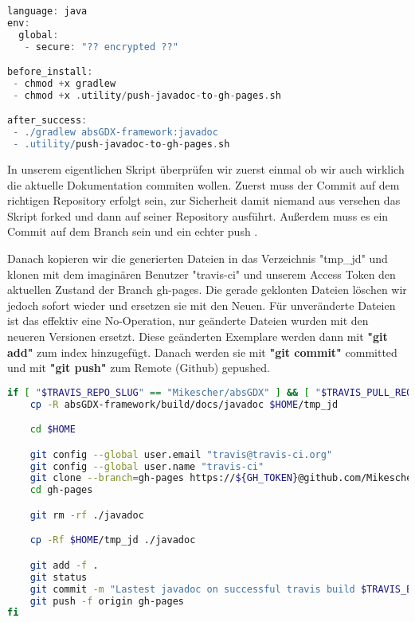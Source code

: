 \doinline
\begin{lstlisting}[caption=TravisCI Konfiguration für das Erzeugen von JavaDoc, title=\hspace{0 pt}, language=groovy]
language: java
env:
  global:
   - secure: "?? encrypted ??"

before_install:
 - chmod +x gradlew
 - chmod +x .utility/push-javadoc-to-gh-pages.sh

after_success:
 - ./gradlew absGDX-framework:javadoc
 - .utility/push-javadoc-to-gh-pages.sh
\end{lstlisting}

In unserem eigentlichen Skript überprüfen wir zuerst einmal ob wir auch wirklich die aktuelle Dokumentation commiten wollen. Zuerst muss der Commit auf dem richtigen Repository erfolgt sein, zur Sicherheit damit niemand aus versehen das Skript forked und dann auf seiner Repository ausführt. Außerdem muss es ein Commit auf dem Branch  sein und ein echter push .

Danach kopieren wir die generierten Dateien in das Verzeichnis "tmp\_jd" und klonen mit dem imaginären Benutzer "travis-ci" und unserem Access Token den aktuellen Zustand der Branch gh-pages. 
Die gerade geklonten Dateien löschen wir jedoch sofort wieder und ersetzen sie mit den Neuen. 
Für unveränderte Dateien ist das effektiv eine No-Operation, nur geänderte Dateien wurden mit den neueren Versionen ersetzt. 
Diese geänderten Exemplare werden dann mit \textbf{"git add"} zum index hinzugefügt. 
Danach werden sie mit \textbf{"git commit"} committed und mit \textbf{"git push"} zum Remote (Github) gepushed.

\doinline
\begin{lstlisting}[caption=Das Javadoc Publish Bashscript, title=\hspace{0 pt}, language=bash]
if [ "$TRAVIS_REPO_SLUG" == "Mikescher/absGDX" ] && [ "$TRAVIS_PULL_REQUEST" == "false" ] && [ "$TRAVIS_BRANCH" == "master" ]; then
	cp -R absGDX-framework/build/docs/javadoc $HOME/tmp_jd

	cd $HOME

	git config --global user.email "travis@travis-ci.org"
	git config --global user.name "travis-ci"
	git clone --branch=gh-pages https://${GH_TOKEN}@github.com/Mikescher/absGDX gh-pages
	cd gh-pages

	git rm -rf ./javadoc

	cp -Rf $HOME/tmp_jd ./javadoc

	git add -f .
	git status
	git commit -m "Lastest javadoc on successful travis build $TRAVIS_BUILD_NUMBER auto-pushed to gh-pages"
	git push -f origin gh-pages
fi
\end{lstlisting}

